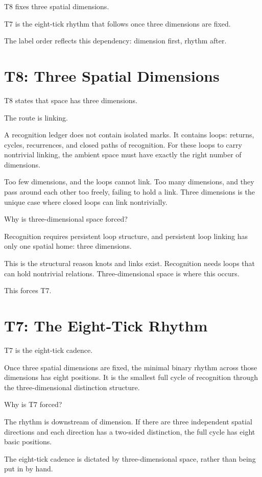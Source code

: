 \documentclass[11pt]{article}
\begin{document}
T8 fixes three spatial dimensions.

T7 is the eight-tick rhythm that follows once three dimensions are fixed.

The label order reflects this dependency: dimension first, rhythm after.

\section{T8: Three Spatial Dimensions}

T8 states that space has three dimensions.

The route is linking.

A recognition ledger does not contain isolated marks. It contains loops: returns, cycles, recurrences, and closed paths of recognition. For these loops to carry nontrivial linking, the ambient space must have exactly the right number of dimensions.

Too few dimensions, and the loops cannot link. Too many dimensions, and they pass around each other too freely, failing to hold a link. Three dimensions is the unique case where closed loops can link nontrivially.

Why is three-dimensional space forced?

Recognition requires persistent loop structure, and persistent loop linking has only one spatial home: three dimensions.

This is the structural reason knots and links exist. Recognition needs loops that can hold nontrivial relations. Three-dimensional space is where this occurs.

This forces T7.

\section{T7: The Eight-Tick Rhythm}

T7 is the eight-tick cadence.

Once three spatial dimensions are fixed, the minimal binary rhythm across those dimensions has eight positions. It is the smallest full cycle of recognition through the three-dimensional distinction structure.

Why is T7 forced?

The rhythm is downstream of dimension. If there are three independent spatial directions and each direction has a two-sided distinction, the full cycle has eight basic positions.

The eight-tick cadence is dictated by three-dimensional space, rather than being put in by hand.
\end{document}
